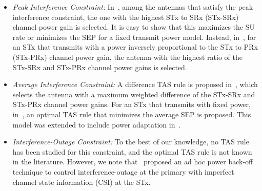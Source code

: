 \documentclass[12pt,draftcls,peerreview,onecolumn]{IEEEtran}
\begin{document}
\begin{itemize}
\item {\em Peak Interference Constraint:} In~\cite{Hanif_2015_globecom}, among the antennas that satisfy the peak interference constraint, the one with the highest STx to SRx (STx-SRx) channel power gain is selected. It is easy to show that this maximizes the SU rate or minimizes the SEP for a fixed transmit power model. Instead, in~\cite{Wang_2010_TWC}, for an  STx that transmits with a power inversely proportional to the STx to PRx (STx-PRx) channel power gain, the antenna with the highest ratio of the STx-SRx and STx-PRx channel power gains is selected. 
%
\item {\em Average Interference Constraint:} A difference TAS rule is proposed in~\cite{Wang_2011_TCom}, which selects the antenna with a maximum weighted difference of the STx-SRx and STx-PRx channel power gains. For an STx that transmits with fixed power, in~\cite{Sarvendranath_2013_TCOM}, an optimal TAS rule that minimizes the average SEP is proposed. %
This model was extended to include power adaptation in~\cite{Sarvendranath_2014_TCOM}. %
%
\item{\em Interference-Outage Constraint:} To the best of our knowledge, no TAS rule has been studied for this constraint, and the optimal TAS rule is not known in the literature. However, we note that~\cite{Peng_2016_eurasip} proposed an ad hoc power back-off technique to control interference-outage at the primary with imperfect channel state information (CSI) at the STx.

\end{itemize}
\end{document}
